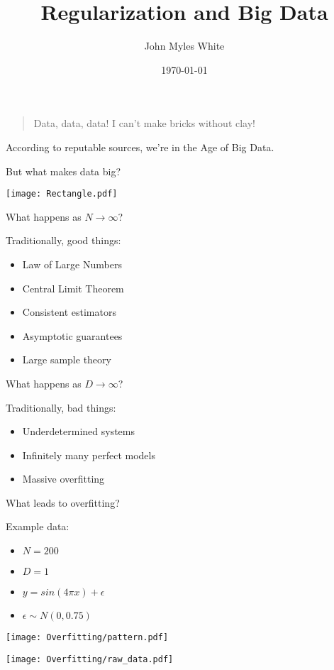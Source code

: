 \documentclass[xcolor=pdftex,dvipsnames,table]{beamer}
\title{Regularization and Big Data}
\author{John Myles White}
\date{\today}
\begin{document}
\frame{\titlepage}

\frame
{
	\begin{quote}
Data, data, data! I can't make bricks without clay!
	\end{quote}
}

\frame
{
	According to reputable sources, we're in the Age of Big Data.
}

\frame
{
	But what makes data big?
}

\frame
{
	\begin{center}
		\texttt{[image: Rectangle.pdf]}
	\end{center}
}

\frame
{
	What happens as $N \to \infty$?
}

\frame
{
	Traditionally, good things:
	\begin{itemize}
		\item{Law of Large Numbers}
		\item{Central Limit Theorem}
		\item{Consistent estimators}
		\item{Asymptotic guarantees}
		\item{Large sample theory}
	\end{itemize}
}

\frame
{
	What happens as $D \to \infty$?
}

\frame
{
	Traditionally, bad things:
	\begin{itemize}
		\item{Underdetermined systems}
		\item{Infinitely many perfect models}
		\item{Massive overfitting}
	\end{itemize}
}

\frame
{
	What leads to overfitting?
}

\frame
{
	Example data:
		\begin{itemize}
			\item{$N = 200$}
			\item{$D = 1$}
			\item{$y = sin(4 \pi x) + \epsilon$}
			\item{$\epsilon \sim N(0, 0.75)$}
		\end{itemize}
}

\frame
{
	\begin{center}
		\texttt{[image: Overfitting/pattern.pdf]}
	\end{center}
}

\frame
{
	\begin{center}
		\texttt{[image: Overfitting/raw\_data.pdf]}
	\end{center}
}
\end{document}
